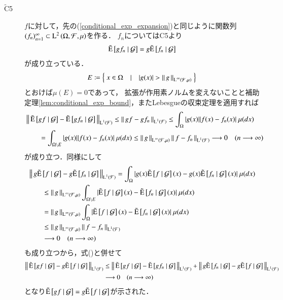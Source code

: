 \begin{prf}
\begin{description}
			\item[$\tilde{\mathrm{C}}$5]
				$f$に対して，先の(\ref{conditional_exp_expansion})と同じように関数列$(f_n)_{n=1}^{\infty} \subset \operatorname{L}^{2} \left(\Omega,\mathcal{F},\mu\right)$を作る．
				$f_n$についてはC5より
				\begin{align}
					\tilde{\operatorname{E}} \left[ gf_n \ \middle|\ \mathcal{G} \right] = g\tilde{\operatorname{E}} \left[ f_n \ \middle|\ \mathcal{G} \right] \label{eq:conditional_exp_L1}
				\end{align}
				が成り立っている．
				\begin{align}
					E \coloneqq \left\{\ x \in \Omega\quad |\quad |g(x)| > \left\|\, g\, \right\|_{\operatorname{L}^{\infty} \left(\mathcal{F},\mu\right)}\ \right\}
				\end{align}
				とおけば$\mu(E) = 0$であって，
				拡張が作用素ノルムを変えないことと補助定理\ref{lem:conditional_exp_bound}，またLebesgueの収束定理を適用すれば
				\begin{align}
					&\left\|\, \tilde{\operatorname{E}} \left[ gf \ \middle|\ \mathcal{G} \right] - \tilde{\operatorname{E}} \left[ gf_n \ \middle|\ \mathcal{G} \right]\, \right\|_{\operatorname{L}^{1} \left(\mathcal{F}\right)}
					\leq \left\|\, gf - gf_n\, \right\|_{\operatorname{L}^{1} \left(\mathcal{F}\right)} 
					\leq \int_\Omega |g(x)||f(x) - f_n(x)|\ \mu(dx) \\
					&\qquad = \int_{\Omega \backslash E} |g(x)||f(x) - f_n(x)|\ \mu(dx) \leq \left\|\, g\, \right\|_{\operatorname{L}^{\infty} \left(\mathcal{F},\mu\right)}\left\|\, f - f_n\, \right\|_{\operatorname{L}^{1} \left(\mathcal{F}\right)}
					\longrightarrow 0 \quad (n \longrightarrow \infty)
				\end{align}
				が成り立つ．同様にして
				\begin{align}
					&\Norm{g\tcexp{f}{\mathcal{G}} - g\tcexp{f_n}{\mathcal{G}}}{\Lp{1}{\mathcal{F}}}
					= \int_\Omega |g(x)\tcexp{f}{\mathcal{G}}(x) - g(x)\tcexp{f_n}{\mathcal{G}}(x)|\ \mu(dx) \\
					&\qquad \leq \Norm{g}{\Lp{\infty}{\mathcal{F},\mu}} \int_{\Omega \backslash E} |\tcexp{f}{\mathcal{G}}(x) - \tcexp{f_n}{\mathcal{G}}(x)|\ \mu(dx) \\
					&\qquad= \Norm{g}{\Lp{\infty}{\mathcal{F},\mu}} \int_{\Omega} |\tcexp{f}{\mathcal{G}}(x) - \tcexp{f_n}{\mathcal{G}}(x)|\ \mu(dx) \\
					&\qquad\leq \Norm{g}{\Lp{\infty}{\mathcal{F},\mu}}\Norm{f - f_n}{\Lp{1}{\mathcal{F}}} \\
					&\qquad \longrightarrow 0 \quad (n \longrightarrow \infty)
				\end{align}
				も成り立つから，式()と併せて
				\begin{align}
					\left\|\, \tilde{\operatorname{E}} \left[ gf \ \middle|\ \mathcal{G} \right] - g\tilde{\operatorname{E}} \left[ f \ \middle|\ \mathcal{G} \right]\, \right\|_{\operatorname{L}^{1} \left(\mathcal{F}\right)}
					&\leq \left\|\, \tilde{\operatorname{E}} \left[ gf \ \middle|\ \mathcal{G} \right] - \tilde{\operatorname{E}} \left[ gf_n \ \middle|\ \mathcal{G} \right]\, \right\|_{\operatorname{L}^{1} \left(\mathcal{F}\right)}
						+ \left\|\, g\tilde{\operatorname{E}} \left[ f_n \ \middle|\ \mathcal{G} \right] - g\tilde{\operatorname{E}} \left[ f \ \middle|\ \mathcal{G} \right]\, \right\|_{\operatorname{L}^{1} \left(\mathcal{F}\right)} \\
					&\longrightarrow 0 \quad (n \longrightarrow \infty)
				\end{align}
				となり$\tilde{\operatorname{E}} \left[ gf \ \middle|\ \mathcal{G} \right] = g\tilde{\operatorname{E}} \left[ f \ \middle|\ \mathcal{G} \right]$が示された．
			

\end{description}
\end{prf}
